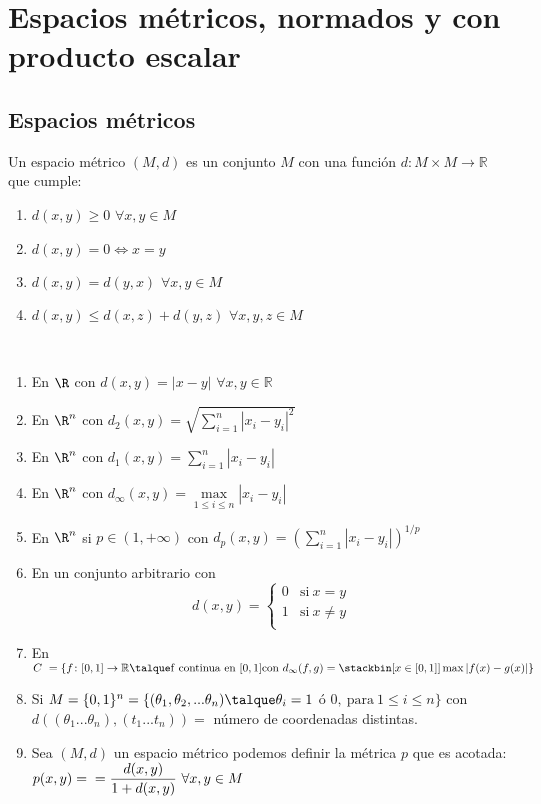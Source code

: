\chapter[Espacios métricos]{Espacios métricos, normados y con producto escalar}
	\section{Espacios métricos}
	
	\begin{defi} 
	 Un espacio m\'etrico $(M,d)$ es un conjunto $M$ con una funci\'on $d \colon M\times M \to \mathbb{R}$ que cumple:
		\begin{enumerate}[1)]
			\item $d(x,y) \geq 0$ $ \forall x, y \in M$
		
			\item $d(x,y) = 0 \Leftrightarrow x = y$
		
			\item $d(x,y) = d(y,x) $ $ \forall x, y \in M$
		
			\item $d(x,y) \leq d(x,z) + d(y,z)$ $    \forall x, y, z \in M$
		\end{enumerate}
	\end{defi}

	\begin{ejem} \ 
		\begin{enumerate}[1)]
			\item En $\R$ con $d(x,y) = |x-y| $ $\forall x, y \in \mathbb{R}$
			\item En $\R ^{n}$ con $d_2(x,y)= \sqrt{\sum_{i = 1}^{n} |x_i-y_i|^{2}} $
			\item En $\R ^{n}$ con $d_1(x,y)= \sum_{i = 1}^{n} |x_i - y_i| $
			\item En $\R ^{n}$ con $d_\infty(x,y)= \underset{1\leq i\leq n}\max|x_i - y_i|$
			\item En $\R^n$ si $p\in (1, +\infty )$ con $d_p(x,y) =(\sum_{i=1}^n |x_i - y_i|)^{1/p}$
			\item En un conjunto arbitrario con
		\[d(x,y)  = \left\{
	       \begin{array}{ll}
		 0      & \mathrm{si\ } x = y \\
		 1 		& \mathrm{si\ } x \neq y \\
	       \end{array}
	     \right.\]
		
			\item En $C\ =\{ f \colon [0,1] \to \mathbb{R}\talque \mathrm{f\ continua\ en\ } [0, 1] \mathrm{con\ } d_\infty(f,g)=\stackbin[{x\in [0,1]}]{}\max |f(x)-g(x)|\}$
			\item Si $M=\{ 0,1\}^n=\{(\theta_1,\theta_2,...\theta_n)\talque\theta_i=1$ \'o $0, \mathrm{\ para\ } 1 \leq i \leq n\} $ con $d((\theta_1...\theta_n),(t_1...t_n))=$ n\'umero de coordenadas distintas.
			\item Sea $(M,d)$ un espacio m\'etrico podemos definir la m\'etrica $p$ que es acotada: $p(x,y)=\\=\dfrac{d(x,y)}{1+d(x,y)} \ \forall x,y \in M$
		\end{enumerate}
	\end{ejem}

